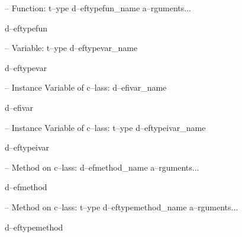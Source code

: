 \documentclass{book}
\begin{document}
\hbox{}-- Function: t--ype d--eftypefun\_name a--rguments...


d--eftypefun




\hbox{}-- Variable: t--ype d--eftypevar\_name


d--eftypevar




\hbox{}-- Instance Variable of c--lass: d--efivar\_name


d--efivar




\hbox{}-- Instance Variable of c--lass: t--ype d--eftypeivar\_name


d--eftypeivar




\hbox{}-- Method on c--lass: d--efmethod\_name a--rguments...


d--efmethod




\hbox{}-- Method on c--lass: t--ype d--eftypemethod\_name a--rguments...


d--eftypemethod
\end{document}
